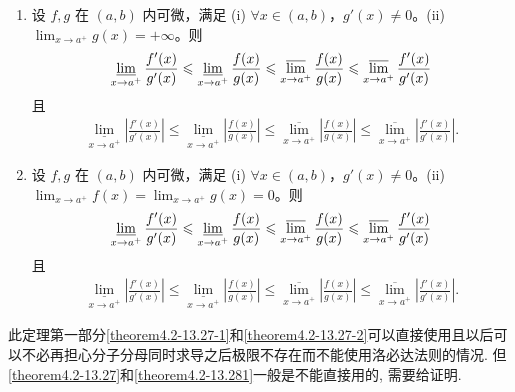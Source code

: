\documentclass[../../main.tex]{subfiles}%
\begin{document}
\begin{theorem}\label{theorem:上下极限L'Hospital法则}
\begin{enumerate}
\item 设 \(f, g\) 在 \((a,b)\) 内可微，满足 (i) \(\forall x \in (a,b)\)，\(g'(x) \ne 0\)。(ii) \(\lim_{x \to a^+} g(x) = +\infty\)。则
\begin{align}
\varliminf_{x \to a^+} \frac{f'(x)}{g'(x)} \leqslant \varliminf_{x \to a^+} \frac{f(x)}{g(x)} \leqslant \varlimsup_{x \to a^+} \frac{f(x)}{g(x)} \leqslant \varlimsup_{x \to a^+} \frac{f'(x)}{g'(x)}\label{theorem4.2-13.27-1}
\end{align}
且
\begin{align}\label{theorem4.2-13.27}
\underset{x\rightarrow a^+}{\underline{\lim }}\left| \frac{f' \left( x \right)}{g' \left( x \right)} \right|\leqslant \underset{x\rightarrow a^+}{\underline{\lim }}\left| \frac{f\left( x \right)}{g\left( x \right)} \right|\leqslant \underset{x\rightarrow a^+}{\overline{\lim }}\left| \frac{f\left( x \right)}{g\left( x \right)} \right|\leqslant \underset{x\rightarrow a^+}{\overline{\lim }}\left| \frac{f' \left( x \right)}{g' \left( x \right)} \right|.
\end{align}


\item 设 \(f, g\) 在 \((a,b)\) 内可微，满足 (i) \(\forall x \in (a,b)\)，\(g'(x) \ne 0\)。(ii) \(\lim_{x \to a^+} f(x) = \lim_{x \to a^+} g(x) = 0\)。则
\begin{align}\label{theorem4.2-13.27-2}
\varliminf_{x \to a^+} \frac{f'(x)}{g'(x)} \leqslant \varliminf_{x \to a^+} \frac{f(x)}{g(x)} \leqslant \varlimsup_{x \to a^+} \frac{f(x)}{g(x)} \leqslant \varlimsup_{x \to a^+} \frac{f'(x)}{g'(x)}
\end{align}
且
\begin{align}\label{theorem4.2-13.281}
\underset{x\rightarrow a^+}{\underline{\lim }}\left| \frac{f' \left( x \right)}{g' \left( x \right)} \right|\leqslant \underset{x\rightarrow a^+}{\underline{\lim }}\left| \frac{f\left( x \right)}{g\left( x \right)} \right|\leqslant \underset{x\rightarrow a^+}{\overline{\lim }}\left| \frac{f\left( x \right)}{g\left( x \right)} \right|\leqslant \underset{x\rightarrow a^+}{\overline{\lim }}\left| \frac{f' \left( x \right)}{g' \left( x \right)} \right|.
\end{align}
\end{enumerate}
\end{theorem}
\begin{note}
此定理第一部分\eqref{theorem4.2-13.27-1}和\eqref{theorem4.2-13.27-2}可以直接使用且以后可以不必再担心分子分母同时求导之后极限不存在而不能使用洛必达法则的情况. 但\eqref{theorem4.2-13.27}和\eqref{theorem4.2-13.281}一般是不能直接用的, 需要给证明.
\end{note}
\end{document}
